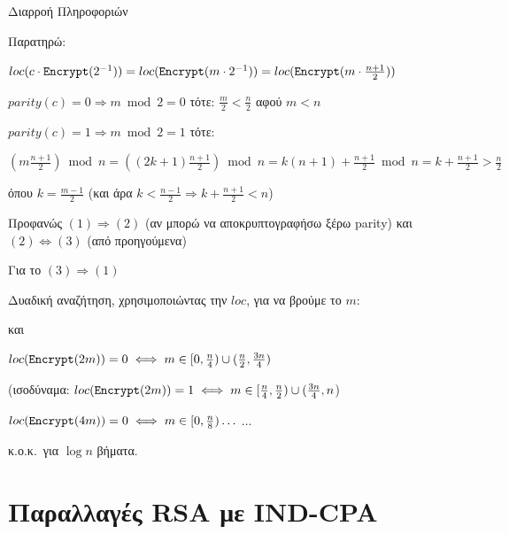 \documentclass[handout]{beamer}
\begin{document}
\begin{frame}[allowframebreaks]{Διαρροή Πληροφοριών}
\medskip

\framebreak



Παρατηρώ:

$loc( c \cdot \mathtt{Encrypt}(2^{-1})) = loc(\mathtt{Encrypt}(m \cdot 2^{-1}))  = loc(\mathtt{Encrypt}(m \cdot \frac{n+1}{2}))$ 

\medskip
$parity(c) = 0 \Rightarrow m \bmod 2 =0$  τότε:
$ \frac{m}{2}   < \frac{n}{2} $ αφού $m<n$

\medskip
$parity(c) = 1 \Rightarrow m \bmod 2 =1$  τότε:

$(m \frac{n+1}{2}) \bmod n  = ( (2 k +1) \frac{n+1}{2}) \bmod n  =  k (n+1) + \frac{n+1}{2} \bmod n 
= k + \frac{n+1}{2} > \frac{n}{2}$

όπου $k=\frac{m-1}{2}$ (και άρα $k < \frac{n-1}{2} \Rightarrow k + \frac{n+1}{2} < n$)


\framebreak


Προφανώς $(1) \Rightarrow (2)$ (αν μπορώ να αποκρυπτογραφήσω ξέρω parity) και $(2) \Leftrightarrow (3)$ (από προηγούμενα)

Για το $(3) \Rightarrow (1)$

Δυαδική αναζήτηση, χρησιμοποιώντας την $loc$, για να βρούμε το $m$:

\magenta{$loc(\enc(m)) = 0 \iff m \in [0, \frac{n}{2})$} και 

$loc(\mathtt{Encrypt}(2m)) = 0 \iff m \in [0, \frac{n}{4}) \cup (\frac{n}{2}, \frac{3n}{4})$ 

(ισοδύναμα: $loc(\mathtt{Encrypt}(2m)) = 1 \iff m \in [\frac{n}{4}, \frac{n}{2}) \cup (\frac{3n}{4}, n$)

$loc(\mathtt{Encrypt}(4m)) = 0 \iff m \in [0, \frac{n}{8}) \ldots $ 
$\ldots$

% 
% 
% 
% 

κ.ο.κ.\ για $\log n$ βήματα. 

\end{frame}

\section{Παραλλαγές RSA με IND-CPA}
\end{document}
